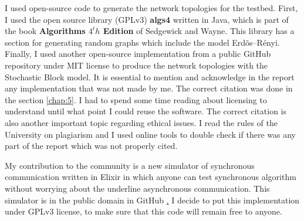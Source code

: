 I used open-source code to generate the network topologies for the testbed. First, I used the open source library (GPLv3) \textbf{algs4} written in Java, which is part of the book \textbf{Algorithms $4^th$ Edition} of Sedgewick and Wayne. This library has a section for generating random graphs which include the model  Erd\~os--R\'enyi. Finally, I used another open-source implementation from a public GitHub repository under MIT license to produce the network topologies with the Stochastic Block model. It is essential to mention and acknowledge in the report any implementation that was not made by me. The correct citation was done in the section \ref{chap:5}. I had to spend some time reading about licensing to understand until what point I could reuse the software. The correct citation is also another important topic regarding ethical issues. I read the rules of the University on plagiarism and I used online tools to double check if there was any part of the report which was not properly cited. 

My contribution to the community is a new simulator of synchronous communication written in Elixir in which anyone can test synchronous algorithm without worrying about the underline asynchronous communication.  This simulator is in the public domain in GitHub \href{https://github.com/mtileria/SymmetryBreaking}. I decide to put this implementation under GPLv3 license, to make sure that this code will remain free to anyone.

